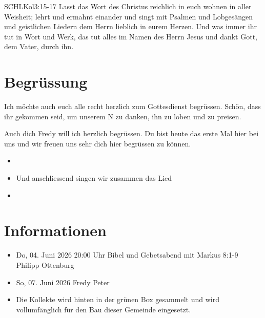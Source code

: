 \documentclass[14pt]{../../inc/mybib}
\newcommand{\Name}{Fredy}
\begin{document}
\begin{bibelbox}{SCHL}{Kol}{3:15-17}
    Lasst das Wort des Christus reichlich in euch wohnen in aller Weisheit; lehrt und ermahnt einander und singt mit Psalmen und Lobgesängen und geistlichen Liedern dem Herrn lieblich in eurem Herzen. Und was immer ihr tut in Wort und Werk, das tut alles im Namen des Herrn Jesus und dankt Gott, dem Vater, durch ihn.
\end{bibelbox}
\section{Begrüssung}
Ich möchte auch euch alle recht herzlich zum Gottesdienst begrüssen. Schön, dass ihr gekommen seid, um unserem \herr N zu danken, ihn zu loben und zu preisen.

Auch dich \Name{} will ich herzlich begrüssen. Du bist heute das erste Mal hier bei uns und wir freuen uns sehr dich hier begrüssen zu können.
\begin{itemize}
    \item[] 
    \item[] Und anschliessend singen wir zusammen das Lied
    \item[] 
\end{itemize}

\section{Informationen}
\begin{itemize}
    \item {} Do, 04. Juni 2026 20:00 Uhr Bibel und Gebetsabend mit Markus 8:1-9 Philipp Ottenburg
    \item {} So, 07. Juni 2026 Fredy Peter
    \item {} Die Kollekte wird hinten in der grünen Box gesammelt und wird vollumfänglich für den Bau dieser Gemeinde eingesetzt.
\end{itemize}
\end{document}
